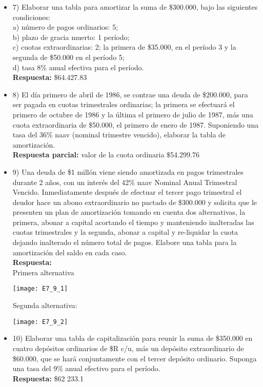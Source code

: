 \begin{itemize}
	\item 7)	Elaborar una tabla para amortizar la suma de \$300.000, bajo las siguientes condiciones:\\
	
	a)	número de pagos ordinarios: 5;\\
	b)	plazo de gracia muerto: 1 período;\\
	c)	cuotas extraordinarias: 2; la primera de \$35.000, en el período 3 y la segunda de \$50.000 en el período 5;\\
	d)	tasa 8\% anual efectiva para el período.\\
	\textbf{Respuesta:} \$64.427.83
	\medskip
	
	\item 8)	El día primero de abril de 1986, se contrae una deuda de \$200.000, para ser pagada en cuotas trimestrales ordinarias; la primera se efectuará el primero de octubre de 1986 y la última el primero de julio de 1987, más una cuota extraordinaria de \$50.000, el primero de enero de 1987. Suponiendo una tasa del 36\% naav (nominal trimestre vencido), elaborar la tabla de amortización.\\
	\textbf{Respuesta parcial:} valor de la cuota ordinaria \$54.299.76
	\medskip
	
	\item 9)	Una deuda de \$1 millón viene siendo amortizada en pagos trimestrales durante 2 años, con un interés del 42\% naav Nominal Anual Trimestral Vencido. Inmediatamente después de efectuar el tercer pago trimestral el deudor hace un abono extraordinario no pactado de \$300.000 y solicita que le presenten un plan de amortización tomando en cuenta dos alternativas, la primera, abonar a capital acortando el tiempo y manteniendo inalteradas las cuotas trimestrales y la segunda, abonar a capital y re-liquidar la cuota dejando inalterado el número total de pagos. Elabore una tabla para la amortización del saldo en cada caso.\\
	\textbf{Respuesta:}\\
	Primera alternativa
	\begin{center}
		\texttt{[image: E7\_9\_1]}
	\end{center}
	Segunda alternativa:
	\begin{center}
		\texttt{[image: E7\_9\_2]}
	\end{center}
	\medskip
	
	\item 10)	 Elaborar una tabla de capitalización para reunir la suma de \$350.000 en cuatro depósitos ordinarios de \$R c/u, más un depósito extraordinario de \$60.000, que se hará conjuntamente con el tercer depósito ordinario. Suponga una tasa del 9\% anual efectivo para el período.\\
	\textbf{ Respuesta:} \$62 233.1 
	\medskip
	

\end{itemize}
